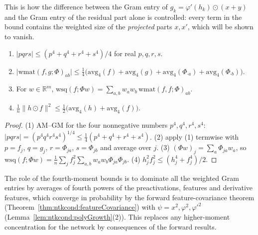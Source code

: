 This is how the difference between the Gram entry of $g_k=\varphi'(h_k)\odot(x+y)$ and the Gram entry of the residual part alone is controlled: every term in the bound contains the weighted size of the \emph{projected} parts $x,x'$, which will be shown to vanish.

\begin{lemma}\label{lem:ntkdn:fourthMoment}
  \leanok
\begin{enumerate}
  \item $|pqrs|\le(p^4+q^4+r^4+s^4)/4$ for real $p,q,r,s$.
  \item $\bigl|\mathrm{wmat}(f,g;\Phi)_{ab}\bigr|\le\tfrac14\bigl(\mathrm{avg}_4(f)+\mathrm{avg}_4(g)+\mathrm{avg}_4(\Phi_{\cdot a})+\mathrm{avg}_4(\Phi_{\cdot b})\bigr)$.
  \item For $w\in\mathbb R^m$, $\mathrm{wsq}(f;\Phi w)=\sum_{a,b}w_aw_b\,\mathrm{wmat}(f,f;\Phi)_{ab}$.
  \item $\tfrac1n\|h\odot f\|^2\le\tfrac12\bigl(\mathrm{avg}_4(h)+\mathrm{avg}_4(f)\bigr)$.
\end{enumerate}
\end{lemma}

\begin{proof}
  \leanok
(1) AM--GM for the four nonnegative numbers $p^4,q^4,r^4,s^4$: $|pqrs|=(p^4q^4r^4s^4)^{1/4}\le\frac14(p^4+q^4+r^4+s^4)$. (2) apply (1) termwise with $p=f_j$, $q=g_j$, $r=\Phi_{ja}$, $s=\Phi_{jb}$ and average over $j$. (3) $(\Phi w)_j=\sum_a\Phi_{ja}w_a$, so $\mathrm{wsq}(f;\Phi w)=\frac1n\sum_jf_j^2\sum_{a,b}w_aw_b\Phi_{ja}\Phi_{jb}$. (4) $h_j^2f_j^2\le(h_j^4+f_j^4)/2$.
\end{proof}

The role of the fourth-moment bounds is to dominate all the weighted Gram entries by averages of fourth powers of the preactivations, features and derivative features, which converge in probability by the forward feature-covariance theorem (Theorem~\ref{thm:ntkcond:featureCovariance}) with $\psi=x^2,\varphi^2,\varphi'^2$ (Lemma~\ref{lem:ntkcond:polyGrowth}(2)). This replaces any higher-moment concentration for the network by consequences of the forward results.

